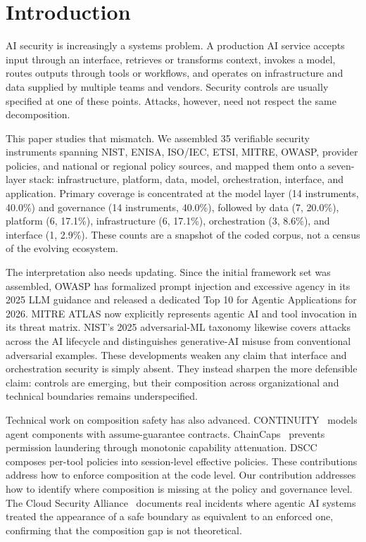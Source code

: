 \documentclass[runningheads]{llncs}
\begin{document}
\section{Introduction}

AI security is increasingly a systems problem. A production AI service accepts input through an interface, retrieves or transforms context, invokes a model, routes outputs through tools or workflows, and operates on infrastructure and data supplied by multiple teams and vendors. Security controls are usually specified at one of these points. Attacks, however, need not respect the same decomposition.

This paper studies that mismatch. We assembled 35 verifiable security instruments spanning NIST, ENISA, ISO/IEC, ETSI, MITRE, OWASP, provider policies, and national or regional policy sources, and mapped them onto a seven-layer stack: infrastructure, platform, data, model, orchestration, interface, and application. Primary coverage is concentrated at the model layer (14 instruments, 40.0\%) and governance (14 instruments, 40.0\%), followed by data (7, 20.0\%), platform (6, 17.1\%), infrastructure (6, 17.1\%), orchestration (3, 8.6\%), and interface (1, 2.9\%). These counts are a snapshot of the coded corpus, not a census of the evolving ecosystem.

The interpretation also needs updating. Since the initial framework set was assembled, OWASP has formalized prompt injection and excessive agency in its 2025 LLM guidance and released a dedicated Top 10 for Agentic Applications for 2026. MITRE ATLAS now explicitly represents agentic AI and tool invocation in its threat matrix. NIST's 2025 adversarial-ML taxonomy likewise covers attacks across the AI lifecycle and distinguishes generative-AI misuse from conventional adversarial examples. These developments weaken any claim that interface and orchestration security is simply absent. They instead sharpen the more defensible claim: controls are emerging, but their composition across organizational and technical boundaries remains underspecified. \cite{owasp2025,owaspagentic2026,mitreatlas2026,nist2025aml}

Technical work on composition safety has also advanced. CONTINUITY~\cite{continuity2026} models agent components with assume-guarantee contracts. ChainCaps~\cite{chaincaps2026} prevents permission laundering through monotonic capability attenuation. DSCC~\cite{dscc2026} composes per-tool policies into session-level effective policies. These contributions address how to enforce composition at the code level. Our contribution addresses how to identify where composition is missing at the policy and governance level. The Cloud Security Alliance~\cite{csa2026trustboundary} documents real incidents where agentic AI systems treated the appearance of a safe boundary as equivalent to an enforced one, confirming that the composition gap is not theoretical.
\end{document}
